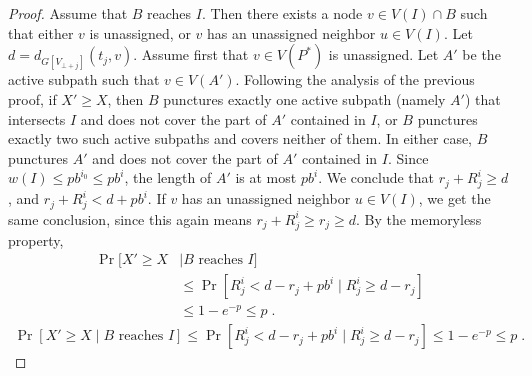 \documentclass[twoside,leqno,twocolumn]{article}
\begin{document}
\begin{proof}
Assume that $B$ reaches $I$. Then there exists a node $v \in V(I) \cap B$ such that either $v$ is unassigned, or $v$ has an unassigned neighbor $u \in V(I)$.
Let $d = d_{G[V_{\bot+j}]}(t_j,v)$.
Assume first that $v \in V(P^*)$ is unassigned. Let $A'$ be the active subpath such that $v \in V(A')$.
Following the analysis of the previous proof, if $X' \ge X$, then $B$ punctures exactly one active subpath (namely $A'$) that intersects $I$ and does not cover the part of $A'$ contained in $I$, or $B$ punctures exactly two  such active subpaths and covers neither of them. In either case, $B$ punctures $A'$ and does not cover the part of $A'$ contained in $I$. Since $w(I) \le pb^{i_0} \le pb^i$, the length of $A'$ is at most $pb^i$. We conclude that $r_j + R^i_j \ge d$, and $r_j + R^i_j < d + pb^i$.
If $v$ has an unassigned neighbor $u \in V(I)$, we get the same conclusion, since this again means $r_j +R_j^i \ge r_j \ge d$. By the memoryless property,
\ifprocs
\begin{align*}
\Pr[X' \ge X &\mid \text{$B$ reaches $I$}] 
\\ &\le \Pr[R_{j}^i < d-r_{j} + pb^i \mid R_{j}^i \ge d-r_{j}] \\ &\le  1-e^{-p} \le p \;.
\end{align*}
\else
\begin{align*}
\Pr[X' \ge X \mid \text{$B$ reaches $I$}] 
\le \Pr[R_{j}^i < d-r_{j} + pb^i \mid R_{j}^i \ge d-r_{j}] \le  1-e^{-p} \le p \;.
\end{align*}
\fi
\end{proof}
\end{document}
